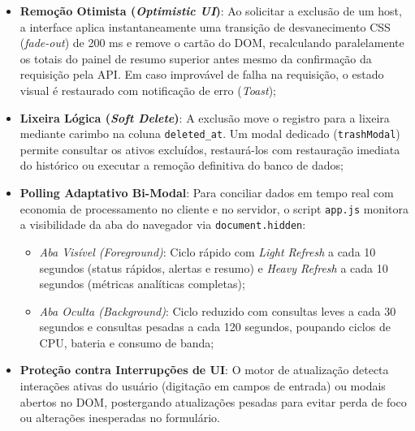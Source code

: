 \documentclass[12pt,a4paper]{article}
\begin{document}
\begin{itemize}[leftmargin=1.25cm]
\item \textbf{Remoção Otimista (\textit{Optimistic UI})}: Ao solicitar a exclusão de um host, a interface aplica instantaneamente uma transição de desvanecimento CSS (\textit{fade-out}) de 200 ms e remove o cartão do DOM, recalculando paralelamente os totais do painel de resumo superior antes mesmo da confirmação da requisição pela API. Em caso improvável de falha na requisição, o estado visual é restaurado com notificação de erro (\textit{Toast});
\item \textbf{Lixeira Lógica (\textit{Soft Delete})}: A exclusão move o registro para a lixeira mediante carimbo na coluna \texttt{deleted\_at}. Um modal dedicado (\texttt{trashModal}) permite consultar os ativos excluídos, restaurá-los com restauração imediata do histórico ou executar a remoção definitiva do banco de dados;
\item \textbf{Polling Adaptativo Bi-Modal}: Para conciliar dados em tempo real com economia de processamento no cliente e no servidor, o script \texttt{app.js} monitora a visibilidade da aba do navegador via \texttt{document.hidden}:
  \begin{itemize}
  \item \textit{Aba Visível (Foreground)}: Ciclo rápido com \textit{Light Refresh} a cada 10 segundos (status rápidos, alertas e resumo) e \textit{Heavy Refresh} a cada 10 segundos (métricas analíticas completas);
  \item \textit{Aba Oculta (Background)}: Ciclo reduzido com consultas leves a cada 30 segundos e consultas pesadas a cada 120 segundos, poupando ciclos de CPU, bateria e consumo de banda;
  \end{itemize}
\item \textbf{Proteção contra Interrupções de UI}: O motor de atualização detecta interações ativas do usuário (digitação em campos de entrada) ou modais abertos no DOM, postergando atualizações pesadas para evitar perda de foco ou alterações inesperadas no formulário.
\end{itemize}
\end{document}
